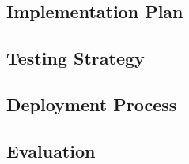\subsection{Implementation Plan}


\subsection{Testing Strategy}


\subsection{Deployment Process}

\subsection{Evaluation }



%
%




